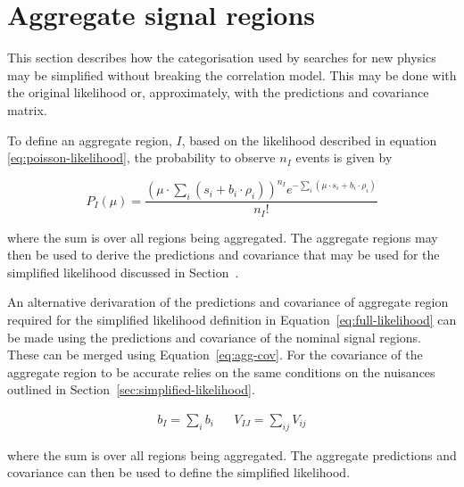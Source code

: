 \section{Aggregate signal regions}
\label{sec:aggregate-signal-regions}

This section describes how the categorisation used by searches for new
physics may be simplified without breaking the correlation model. 
This may be done with the original likelihood or, approximately,
with the predictions and covariance matrix.

To define an aggregate region, $I$, based on the likelihood described in equation
\ref{eq:poisson-likelihood}, the probability to observe $n_{I}$ events is given by

\begin{equation}
 P_{I}(\mu) = \dfrac{(\mu \cdot \sum_i(s_{i}+b_{i} \cdot \rho_{i}))^{n_{I}} e^{-\sum_i(\mu \cdot s_{i}+b_{i}\cdot\rho_{i})} }{n_{I}!}
\label{eq:agg-likelihood}
\end{equation}

where the sum is over all regions being aggregated. The aggregate regions
may then be used to derive the predictions and covariance that may be
used for the simplified likelihood discussed in 
Section~.

An alternative derivaration of the predictions and covariance of aggregate region 
required for the simplified likelihood definition in Equation~\ref{eq:full-likelihood} can
be made using the predictions and covariance of the nominal signal regions.
These can be merged using Equation~\ref{eq:agg-cov}. For the covariance of the aggregate
region to be accurate relies on the same conditions on the nuisances outlined 
in Section~\ref{sec:simplified-likelihood}. 

\begin{align}
b_{I} = \sum_i b_{i} && V_{IJ}=\sum_{ij}V_{ij}
\label{eq:agg-cov}
\end{align}

where the sum is over all regions being aggregated. The aggregate predictions
and covariance can then be used to define the simplified likelihood.

